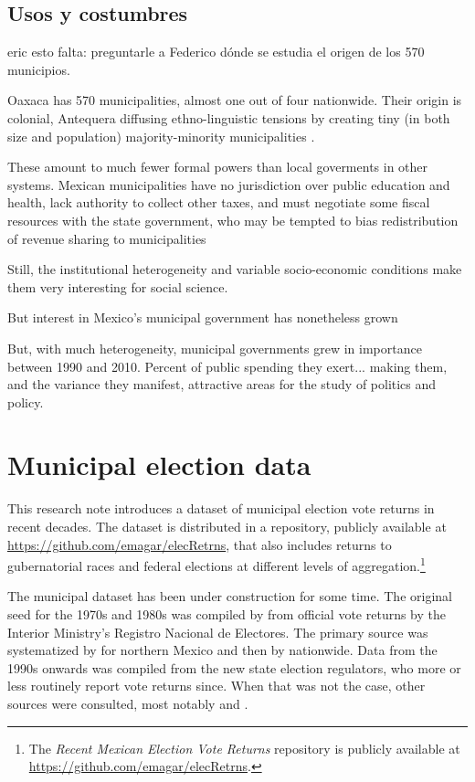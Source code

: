 \documentclass[letter,12pt]{article}
\begin{document}
\subsection{Usos y costumbres}
eric esto falta: preguntarle a Federico dónde se estudia el origen de los 570 municipios.

Oaxaca has 570 municipalities, almost one out of four nationwide. Their origin is colonial, Antequera diffusing ethno-linguistic tensions by creating tiny (in both size and population) majority-minority municipalities \citep{elizarraras.2002}. 

These amount to much fewer formal powers than local goverments in other systems. Mexican municipalities have no jurisdiction over public education and health, lack authority to collect other taxes, and must negotiate some fiscal resources with the state government, who may be tempted to bias redistribution of revenue sharing to municipalities \citep{timmons.broid.2013} 

Still, the institutional heterogeneity and variable socio-economic conditions make them very interesting for social science. 

But interest in Mexico's municipal government has nonetheless grown

But, with much heterogeneity, municipal governments grew in importance between 1990 and 2010. Percent of public spending they exert... making them, and the variance they manifest, attractive areas for the study of politics and policy. 

\section{Municipal election data}
This research note introduces a dataset of municipal election vote returns in recent decades. The dataset is distributed in a repository, publicly available at \url{https://github.com/emagar/elecRetrns}, that also includes returns to gubernatorial races and federal elections at different levels of aggregation.\footnote{The \emph{Recent Mexican Election Vote Returns} repository is publicly available at \url{https://github.com/emagar/elecRetrns}.} 

The municipal dataset has been under construction for some time. The original seed for the 1970s and 1980s was compiled by \citet{molinar.1991a} from official vote returns by the Interior Ministry's Registro Nacional de Electores. The primary source was systematized by \citet{magar.1994} for northern Mexico and then by \citet{varela.2004} nationwide. Data from the 1990s onwards was compiled from the new state election regulators, who more or less routinely report vote returns since. When that was not the case, other sources were consulted, most notably \citet{revista.voz.y.voto} and \citet{cede.uam.izt}.
\end{document}
